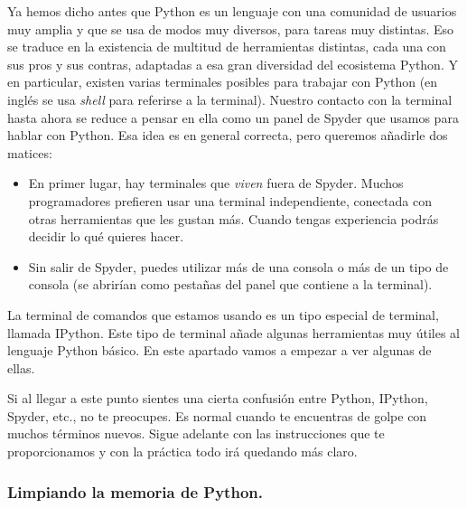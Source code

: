 \documentclass[10pt,a4paper]{article}\usepackage[]{graphicx}\usepackage[]{color}
\newcounter {cont01}
\begin{document}
Ya hemos dicho antes que Python es un lenguaje con una comunidad de usuarios muy amplia y que se usa de modos muy diversos, para tareas muy distintas. Eso se traduce en la existencia de multitud de herramientas distintas, cada una con sus pros y sus contras, adaptadas a esa gran diversidad del ecosistema Python. Y en particular, existen varias terminales posibles para trabajar con Python (en inglés se usa {\em shell} para referirse a la terminal). Nuestro contacto con la terminal hasta ahora se reduce a pensar en ella como un panel de Spyder que usamos para hablar con Python. Esa idea es en general correcta, pero queremos añadirle dos matices:
\begin{itemize}
  \item En primer lugar, hay terminales que {\em viven} fuera de Spyder. Muchos programadores prefieren usar una terminal independiente, conectada con otras herramientas que les gustan más. Cuando tengas experiencia podrás decidir lo qué quieres hacer.
  \item Sin salir de Spyder, puedes utilizar más de una consola o más de un tipo de consola (se abrirían como pestañas del panel que contiene a la terminal).
\end{itemize}
La terminal de comandos que estamos usando es un tipo especial de terminal, llamada {\sf IPython}. Este tipo de terminal añade algunas herramientas muy útiles al lenguaje Python básico. En este apartado vamos a empezar a ver algunas de ellas.

Si al llegar a este punto sientes una cierta confusión entre Python, IPython, Spyder, etc., no te preocupes. Es normal cuando te encuentras de golpe con muchos términos nuevos. Sigue adelante con las instrucciones que te proporcionamos y con la práctica todo irá quedando más claro.

\subsubsection*{Limpiando la memoria de Python.}
\label{tut02:subsubsec:limpiandoMemoriaPython}
\end{document}
